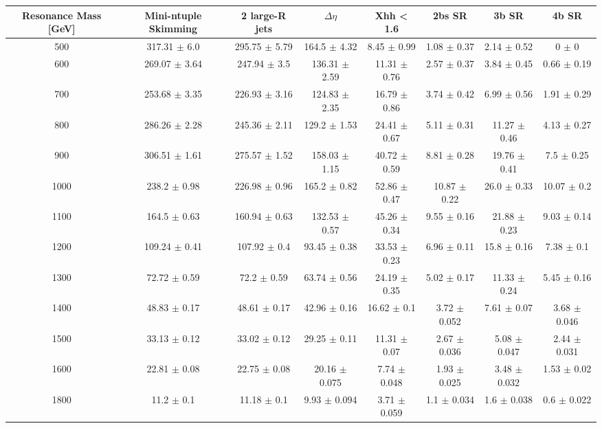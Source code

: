 \begin{footnotesize} 
\begin{tabular}{c|c|c|c|c|c|c|c} 
Resonance Mass [GeV] & Mini-ntuple Skimming & 2 large-R jets & $\Delta\eta$ & Xhh < 1.6 & 2bs SR & 3b SR & 4b SR \\ 
\hline\hline 
500 & 317.31 $\pm$ 6.0 & 295.75 $\pm$ 5.79 & 164.5 $\pm$ 4.32 & 8.45 $\pm$ 0.99 & 1.08 $\pm$ 0.37 & 2.14 $\pm$ 0.52 & 0 $\pm$ 0\\ 
600 & 269.07 $\pm$ 3.64 & 247.94 $\pm$ 3.5 & 136.31 $\pm$ 2.59 & 11.31 $\pm$ 0.76 & 2.57 $\pm$ 0.37 & 3.84 $\pm$ 0.45 & 0.66 $\pm$ 0.19\\ 
700 & 253.68 $\pm$ 3.35 & 226.93 $\pm$ 3.16 & 124.83 $\pm$ 2.35 & 16.79 $\pm$ 0.86 & 3.74 $\pm$ 0.42 & 6.99 $\pm$ 0.56 & 1.91 $\pm$ 0.29\\ 
800 & 286.26 $\pm$ 2.28 & 245.36 $\pm$ 2.11 & 129.2 $\pm$ 1.53 & 24.41 $\pm$ 0.67 & 5.11 $\pm$ 0.31 & 11.27 $\pm$ 0.46 & 4.13 $\pm$ 0.27\\ 
900 & 306.51 $\pm$ 1.61 & 275.57 $\pm$ 1.52 & 158.03 $\pm$ 1.15 & 40.72 $\pm$ 0.59 & 8.81 $\pm$ 0.28 & 19.76 $\pm$ 0.41 & 7.5 $\pm$ 0.25\\ 
1000 & 238.2 $\pm$ 0.98 & 226.98 $\pm$ 0.96 & 165.2 $\pm$ 0.82 & 52.86 $\pm$ 0.47 & 10.87 $\pm$ 0.22 & 26.0 $\pm$ 0.33 & 10.07 $\pm$ 0.2\\ 
1100 & 164.5 $\pm$ 0.63 & 160.94 $\pm$ 0.63 & 132.53 $\pm$ 0.57 & 45.26 $\pm$ 0.34 & 9.55 $\pm$ 0.16 & 21.88 $\pm$ 0.23 & 9.03 $\pm$ 0.14\\ 
1200 & 109.24 $\pm$ 0.41 & 107.92 $\pm$ 0.4 & 93.45 $\pm$ 0.38 & 33.53 $\pm$ 0.23 & 6.96 $\pm$ 0.11 & 15.8 $\pm$ 0.16 & 7.38 $\pm$ 0.1\\ 
1300 & 72.72 $\pm$ 0.59 & 72.2 $\pm$ 0.59 & 63.74 $\pm$ 0.56 & 24.19 $\pm$ 0.35 & 5.02 $\pm$ 0.17 & 11.33 $\pm$ 0.24 & 5.45 $\pm$ 0.16\\ 
1400 & 48.83 $\pm$ 0.17 & 48.61 $\pm$ 0.17 & 42.96 $\pm$ 0.16 & 16.62 $\pm$ 0.1 & 3.72 $\pm$ 0.052 & 7.61 $\pm$ 0.07 & 3.68 $\pm$ 0.046\\ 
1500 & 33.13 $\pm$ 0.12 & 33.02 $\pm$ 0.12 & 29.25 $\pm$ 0.11 & 11.31 $\pm$ 0.07 & 2.67 $\pm$ 0.036 & 5.08 $\pm$ 0.047 & 2.44 $\pm$ 0.031\\ 
1600 & 22.81 $\pm$ 0.08 & 22.75 $\pm$ 0.08 & 20.16 $\pm$ 0.075 & 7.74 $\pm$ 0.048 & 1.93 $\pm$ 0.025 & 3.48 $\pm$ 0.032 & 1.53 $\pm$ 0.02\\ 
1800 & 11.2 $\pm$ 0.1 & 11.18 $\pm$ 0.1 & 9.93 $\pm$ 0.094 & 3.71 $\pm$ 0.059 & 1.1 $\pm$ 0.034 & 1.6 $\pm$ 0.038 & 0.6 $\pm$ 0.022\\ 

\end{tabular}
\end{footnotesize}
